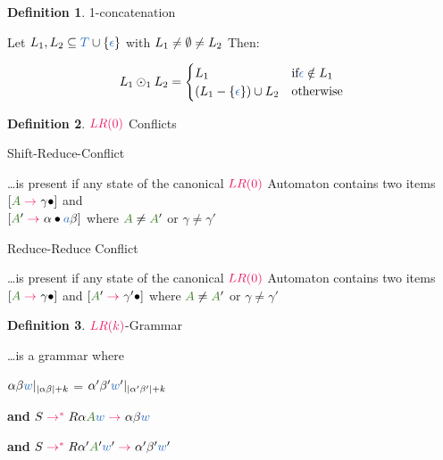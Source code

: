 \documentclass[10pt, landscape]{article}
\theoremstyle{definition}
\newtheorem{definition}{Definition}[section]
\newcommand{\Op}[1]{\textcolor{WildStrawberry}{#1}}
\newcommand{\OneConcat}{\odot_{1}}
\newcommand{\derive}[1][]{\Op{\;\rightarrow_{#1}\;}}
\newcommand{\derives}[1][]{\Op{\;\rightarrow_{#1}^{*}\;}}
\newcommand{\nontermcolor}{OliveGreen}
\newcommand{\nt}[1]{\textcolor{\nontermcolor}{#1}}
\newcommand{\ntA}{\nt{A}}
\newcommand{\termcolor}{NavyBlue}
\newcommand{\terms}{\textcolor{\termcolor}{T}}
\newcommand{\termW}{\textcolor{\termcolor}{w}}
\newcommand{\termA}{\textcolor{\termcolor}{a}}
\newcommand{\termEps}{\textcolor{\termcolor}{\epsilon}}
\newcommand{\prodcolor}{WildStrawberry}
\newcommand{\LRZero}{\textcolor{\prodcolor}{LR (0)}}
\newcommand{\LRk}{\textcolor{\prodcolor}{LR (k)}}
\begin{document}
\begin{multicols*}{3}
\begin{definition}{1-concatenation}
{    Let $\Lang{1}, \Lang{2} \subseteq \terms \cup \{ \termEps \}$ with $L_{1} \neq \emptyset \neq L_{2}$ Then:

    \[
      \Lang{1} \OneConcat \Lang{2} = \begin{cases}
                                       \Lang{1} & \text{if} \termEps \notin \Lang{1} \\
                                       (\Lang{1} - \{\termEps\}) \cup \Lang{2}  & \text{otherwise}
                                     \end{cases}
                                   \]


  }
\end{definition}

\begin{definition}{$\LRZero$ Conflicts}

  \begin{compactenum}
    \item Shift-Reduce-Conflict

          \dots is present if any state of the canonical $\LRZero$ Automaton contains two items
          $[\ntA \derive \gamma \bullet]$ and \\ $[\ntA' \derive \alpha \bullet \termA \beta]$
          where $\ntA \neq \ntA'$ or $\gamma \neq \gamma'$

    \item Reduce-Reduce Conflict

          \dots is present if any state of the canonical $\LRZero$ Automaton contains two items
          $[\ntA \derive \gamma \bullet]$ and $[\ntA' \derive \gamma' \bullet]$
          where $\ntA \neq \ntA'$ or $\gamma \neq \gamma'$

  \end{compactenum}

\end{definition}

\columnbreak
\begin{definition}{$\LRk$-Grammar}

  \dots is a grammar where

  \begin{compactenum}
    \item $\alpha\beta\termW |_{|\alpha\beta|+k}$ = $\alpha'\beta'\termW' |_{|\alpha'\beta'|+k}$
    \item \textbf{and} $S \derives{R} \alpha \ntA \termW \derive \alpha \beta \termW$
    \item \textbf{and} $S \derives{R} \alpha' \ntA' \termW' \derive \alpha' \beta' \termW'$
  \end{compactenum}


\end{definition}
\end{multicols*}
\end{document}
